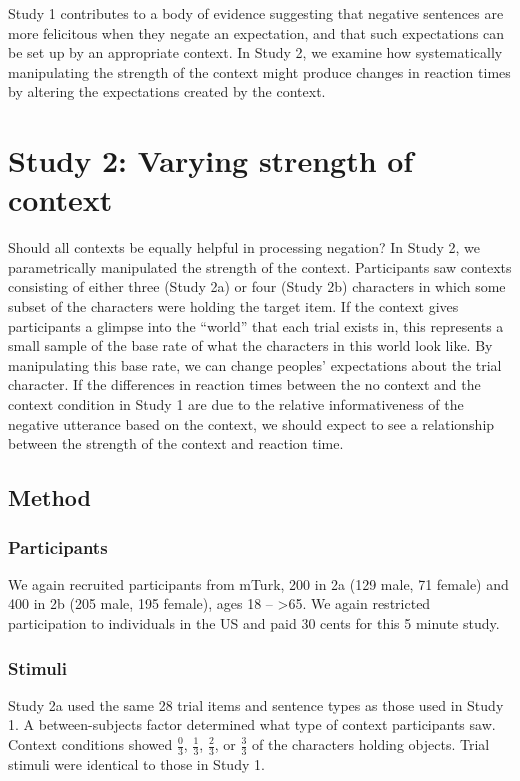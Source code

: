 \documentclass[man]{apa2}
\begin{document}
Study 1 contributes to a body of evidence suggesting that negative sentences are more felicitous when they negate an expectation, and that such expectations can be set up by an appropriate context.  In Study 2, we examine how systematically manipulating the strength of the context might produce changes in reaction times by altering the expectations created by the context.  

\section{Study 2: Varying strength of context}

Should all contexts be equally helpful in processing negation? In Study 2, we parametrically manipulated the strength of the context.  Participants saw contexts consisting of either three (Study 2a) or four (Study 2b) characters in which some subset of the characters were holding the target item.  If the context gives participants a glimpse into the ``world'' that each trial exists in, this represents a small sample of the base rate of what the characters in this world look like.  By manipulating this base rate, we can change peoples' expectations about the trial character.  If the differences in reaction times between the no context and the context condition in Study 1 are due to the relative informativeness of the negative utterance based on the context, we should expect to see a relationship between the strength of the context and reaction time. 

\subsection{Method}

\subsubsection{Participants} 

We again recruited participants from mTurk, 200 in 2a (129 male, 71 female) and  400 in 2b (205 male, 195 female), ages 18 -- \textgreater65. We again restricted participation to individuals in the US and paid 30 cents for this 5 minute study.  

\subsubsection{Stimuli}

Study 2a used the same 28 trial items and sentence types as those used in Study 1.  A between-subjects factor determined what type of context participants saw.  Context conditions showed $\frac{0}{3}$, $\frac{1}{3}$, $\frac{2}{3}$, or $\frac{3}{3}$ of the characters holding objects.  Trial stimuli were identical to those in Study 1.  
\end{document}
